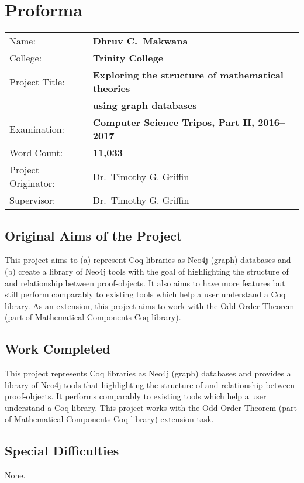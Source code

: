 \chapter*{Proforma}

{%
\begin{tabular}{ll}
Name:               & \bf Dhruv C.\ Makwana \\
College:            & \bf Trinity College                     \\
Project Title:      & \bf Exploring the structure of mathematical theories \\
                    & \bf using graph databases \\
Examination:        & \bf Computer Science Tripos, Part II, 2016--2017 \\
Word Count:         & \bf 11,033 \\
Project Originator: & Dr.\ Timothy G. Griffin \\
Supervisor:         & Dr.\ Timothy G. Griffin \\
\end{tabular}
}

\section*{Original Aims of the Project}

This project aims to (a) represent Coq libraries as Neo4j (graph) databases and
(b) create a library of Neo4j tools with the goal of highlighting the structure
of and relationship between proof-objects.  It also aims to have more features
but still perform comparably to existing tools which help a user understand a
Coq library. As an extension, this project aims to work with the Odd Order
Theorem (part of Mathematical Components Coq library).

\section*{Work Completed}

This project represents Coq libraries as Neo4j (graph) databases and provides a
library of Neo4j tools that highlighting the structure of and relationship
between proof-objects. It performs comparably to existing tools which help a
user understand a Coq library. This project works with the Odd Order Theorem
(part of Mathematical Components Coq library) extension task.

\section*{Special Difficulties}
None.

